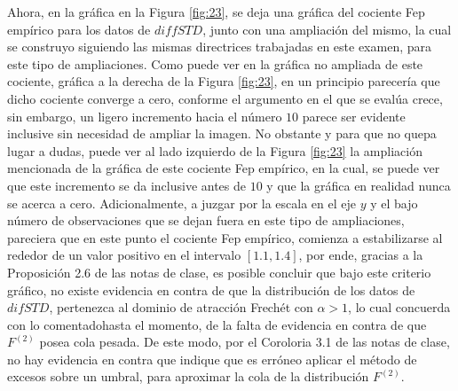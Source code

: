 \documentclass[10.5pt,notitlepage]{article}
\theoremstyle{plain}
\begin{document}
Ahora, en la gráfica en la Figura \ref{fig:23}, se deja una gráfica del cociente Fep empírico para los datos de \(diffSTD\), junto con una ampliación del mismo, la cual se construyo siguiendo las mismas directrices trabajadas en este examen, para este tipo de ampliaciones. Como puede ver en la gráfica no ampliada de este cociente, gráfica a la derecha de la Figura \ref{fig:23}, en un principio parecería que dicho cociente converge a cero, conforme el argumento en el que se evalúa crece, sin embargo, un ligero incremento hacia el número \(10\) parece ser evidente inclusive sin necesidad de ampliar la imagen. No obstante y para que no quepa lugar a dudas, puede ver al lado izquierdo de la Figura \ref{fig:23} la ampliación mencionada de la gráfica de este cociente Fep empírico, en la cual, se puede ver que este incremento se da inclusive antes de \(10\) y que la gráfica en realidad nunca se acerca a cero. Adicionalmente, a juzgar por la escala en el eje \(y\) y el bajo número de observaciones que se dejan fuera en este tipo de ampliaciones, pareciera que en este punto el cociente Fep empírico, comienza a estabilizarse al rededor de un valor positivo en el intervalo \([1.1,1.4]\), por ende, gracias a la Proposición 2.6 de las notas de clase, es posible concluir que bajo este criterio gráfico, no existe evidencia en contra de que la distribución de los datos de \(difSTD\), pertenezca al dominio de atracción Frechét con \(\alpha >1\), lo cual concuerda con lo comentadohasta el momento, de la falta de evidencia en contra de que \(F^{(2)}\) posea cola pesada. De este modo, por el Coroloria 3.1 de las notas de clase, no hay evidencia en contra que indique que es erróneo aplicar el método de excesos sobre un umbral, para aproximar la cola de la distribución \(F^{(2)}\).
\end{document}
